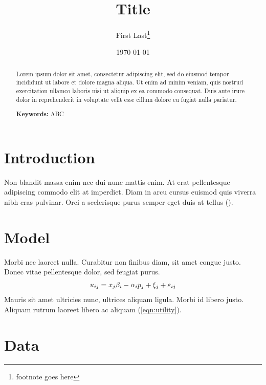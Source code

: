 \documentclass[11pt]{article}
\begin{document}
\begin{titlepage}
  \title{Title}
  \author{First Last\thanks{footnote goes here}}
  \date{\small \today}
  \maketitle
  
  \bigskip

  \begin{abstract}
    \noindent Lorem ipsum dolor sit amet, consectetur adipiscing elit, sed do eiusmod tempor incididunt ut labore et dolore magna aliqua. Ut enim ad minim veniam, quis nostrud exercitation ullamco laboris nisi ut aliquip ex ea commodo consequat. Duis aute irure dolor in reprehenderit in voluptate velit esse cillum dolore eu fugiat nulla pariatur. 

    \bigskip

    \noindent\textbf{Keywords:} ABC
  \end{abstract}

  \setcounter{page}{0}
  \thispagestyle{empty}
\end{titlepage}

\newpage

\section{Introduction} \label{sec:introduction}

Non blandit massa enim nec dui nunc mattis enim. At erat pellentesque adipiscing commodo elit at imperdiet. Diam in arcu cursus euismod quis viverra nibh cras pulvinar. Orci a scelerisque purus semper eget duis at tellus (\cite{koenker2001quantile}). 

\section{Model} \label{sec:model}

Morbi nec laoreet nulla. Curabitur non finibus diam, sit amet congue justo. Donec vitae pellentesque dolor, sed feugiat purus. 
\begin{align}
  u_{ij} = x_j \beta_i - \alpha_i p_j + \xi_j + \varepsilon_{ij} \label{eqn:utility}
\end{align}
Mauris sit amet ultricies nunc, ultrices aliquam ligula. Morbi id libero justo. Aliquam rutrum laoreet libero ac aliquam (\ref{eqn:utility}).

\section{Data} \label{sec:data}
\end{document}
